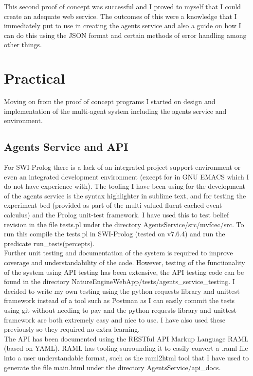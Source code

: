 \documentclass[]{final_report}
\begin{document}
This second proof of concept was successful and I proved to myself that I could create an adequate web service. The outcomes of this were a knowledge that I immediately put to use in creating the agents service and also a guide on how I can do this using the JSON format and certain methods of error handling among other things.

\section{Practical}
Moving on from the proof of concept programs I started on design and implementation of the multi-agent system including the agents service and environment.
\subsection{Agents Service and API}
For SWI-Prolog there is a lack of an integrated project support environment or even an integrated development environment (except for in GNU EMACS which I do not have experience with). The tooling I have been using for the development of the agents service is the syntax highlighter in sublime text, and for testing the experiment bed (provided as part of the multi-valued fluent cached event calculus) and the Prolog unit-test framework. I have used this to test belief revision in the file tests.pl under the directory AgentsService/src/mvfcec/src. To run this compile the tests.pl in SWI-Prolog (tested on v7.6.4) and run the predicate run\_tests(percepts).\\
Further unit testing and documentation of the system is required to improve coverage and understandability of the code. However, testing of the functionality of the system using API testing has been extensive, the API testing code can be found in the directory NatureEngineWebApp/tests/agents\_service\_testing. I decided to write my own testing using the python requests library and unittest framework instead of a tool such as Postman as I can easily commit the tests using git without needing to pay and the python requests library and unittest framework are both extremely easy and nice to use. I have also used these previously so they required no extra learning.\\
The API has been documented using the RESTful API Markup Language RAML (based on YAML). RAML has tooling surrounding it to easily convert a .raml file into a user understandable format, such as the raml2html tool that I have used to generate the file main.html under the directory AgentsService/api\_docs.\\
\end{document}

